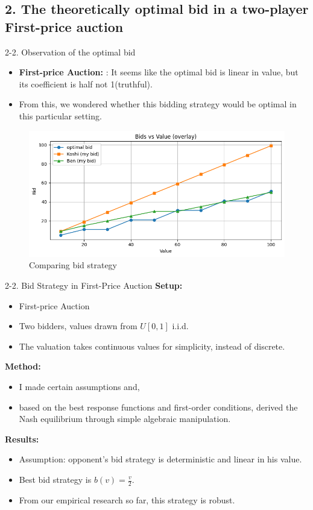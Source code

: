 \documentclass{beamer}
\begin{document}
\subsection{2. The theoretically optimal bid in a two-player First-price auction}

\begin{frame}{2-2. Observation of the optimal bid}
\small
\begin{itemize}
  \item \textbf{First-price Auction:} : It seems like the optimal bid is linear in value, but its coefficient is half not 1(truthful).\\
  \item From this, we wondered whether this bidding strategy would be optimal in this particular setting.
\end{itemize}
\begin{figure}
    \centering
    \includegraphics[width=0.7\linewidth]{332Project1/figures/bid_revised.png}
    \caption{Comparing bid strategy}
    \label{fig:placeholder}
\end{figure}
\end{frame}

\begin{frame}{2-2. Bid Strategy in First-Price Auction}
\small
\textbf{Setup:} \\
\begin{itemize}
    \item First-price Auction
    \item Two bidders, values drawn from $U[0,1]$ i.i.d.
    \item The valuation takes continuous values for simplicity, instead of discrete.
\end{itemize}

\textbf{Method:}
\begin{itemize}
    \item I made certain assumptions and,
    \item based on the best response functions and first-order conditions, derived the Nash equilibrium through simple algebraic manipulation.
\end{itemize} 
\textbf{Results:}
\begin{itemize}
    \item Assumption: opponent's bid strategy is deterministic and linear in his value.
    \item Best bid strategy is $b(v) = \frac{v}{2}$.
    \item From our empirical research so far, this strategy is robust.
\end{itemize}
\end{frame}
\end{document}
